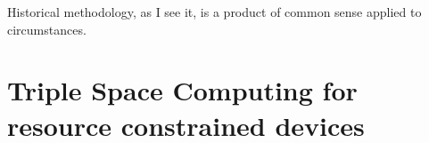 

\begin{savequote}[50mm]
Historical methodology, as I see it, is a product of common sense applied to circumstances. 
\end{savequote}


\chapter{Triple Space Computing for resource constrained devices}
\label{cha:tsc}

\ifpdf
    \graphicspath{{3_overall_methodology/figures/PNG/}{3_overall_methodology/figures/PDF/}{3_overall_methodology/figures/}}
\else
    \graphicspath{{3_overall_methodology/figures/EPS/}{3_overall_methodology/figures/}}
\fi





